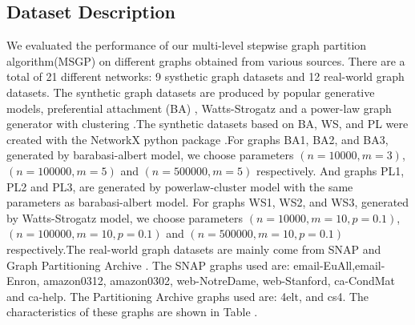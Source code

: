 \documentclass{acm_proc_article-sp}
\begin{document}
\subsection{Dataset Description}
We evaluated the performance of our multi-level stepwise graph partition algorithm(MSGP) on  different graphs obtained from various sources. There are a total of 21 different networks: 9 systhetic graph datasets and 12 real-world graph datasets. The synthetic graph datasets are produced by popular generative models, preferential attachment (BA) \cite{barabasi:emergence}, Watts-Strogatz \cite{small-world-watts-strogatz} and a power-law graph generator with clustering \cite{Holme2002}.The synthetic datasets based on BA, WS, and PL were created with the NetworkX python package \cite{url:networkx}.For graphs BA1, BA2, and BA3, generated by barabasi-albert model, we choose parameters $(n=10000, m=3)$, $(n=100000, m=5)$ and $(n=500000, m=5)$ respectively. And graphs PL1, PL2 and PL3, are generated by powerlaw-cluster model with the same parameters as barabasi-albert model. For graphs WS1, WS2, and WS3, generated by Watts-Strogatz model, we choose parameters $(n=10000, m=10, p=0.1)$, $(n=100000, m=10, p=0.1)$ and $(n=500000, m=10, p=0.1)$ respectively.The real-world graph datasets  are mainly come from SNAP\cite{url:snap} and Graph Partitioning Archive \cite{url:gpa}. The SNAP graphs used are: email-EuAll,email-Enron, amazon0312, amazon0302, web-NotreDame, web-Stanford, ca-CondMat and ca-help. The Partitioning Archive graphs used are:  4elt, and cs4. The characteristics of these graphs are shown in Table .
\end{document}
